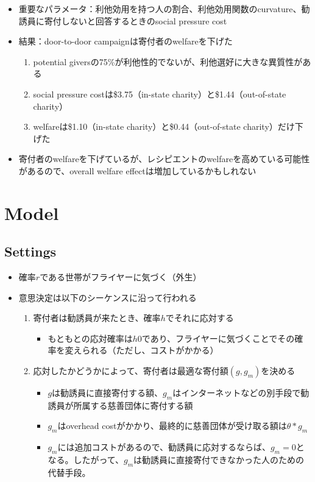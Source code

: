\documentclass[../root]{subfiles}
\begin{document}
\begin{itemize}
        \begin{itemize}
            \item 重要なパラメータ：利他効用を持つ人の割合、利他効用関数のcurvature、勧誘員に寄付しないと回答するときのsocial pressure cost
            \item 結果：door-to-door campaignは寄付者のwelfareを下げた
            \begin{enumerate}
                \item potential giversの75\%が利他性的でないが、利他選好に大きな異質性がある
                \item social pressure costは\$3.75（in-state charity）と\$1.44（out-of-state charity）
                \item welfareは\$1.10（in-state charity）と\$0.44（out-of-state charity）だけ下げた
            \end{enumerate}
            \item 寄付者のwelfareを下げているが、レシピエントのwelfareを高めている可能性があるので、overall welfare effectは増加しているかもしれない
        \end{itemize}
    \end{itemize}

    \section{Model}

    \subsection{Settings}

    \begin{itemize}
        \item 確率$r$である世帯がフライヤーに気づく（外生）
        \item 意思決定は以下のシーケンスに沿って行われる
        \begin{enumerate}
            \item 寄付者は勧誘員が来たとき、確率$h$でそれに応対する
            \begin{itemize}
                \item もともとの応対確率は$h0$であり、フライヤーに気づくことでその確率を変えられる（ただし、コストがかかる）
            \end{itemize}
            \item 応対したかどうかによって、寄付者は最適な寄付額$(g, g_m)$を決める
            \begin{itemize}
                \item $g$は勧誘員に直接寄付する額、$g_m$はインターネットなどの別手段で勧誘員が所属する慈善団体に寄付する額
                \item $g_m$はoverhead costがかかり、最終的に慈善団体が受け取る額は$\theta*g_m$
                \item $g_m$には追加コストがあるので、勧誘員に応対するならば、$g_m = 0$となる。したがって、$g_m$は勧誘員に直接寄付できなかった人のための代替手段。
            \end{itemize}
        \end{enumerate}
    \end{itemize}
    
\end{document}
